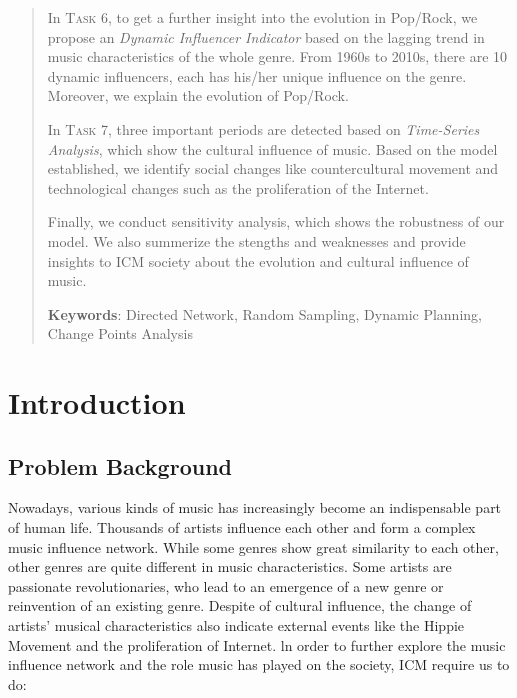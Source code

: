 \documentclass[12pt]{article}  %
\begin{document}
\begin{abstract}
		In \textsc{Task 6}, to get a further insight into the evolution in Pop/Rock, we propose an \textit{Dynamic Influencer Indicator} based on the lagging trend in music characteristics of the whole genre. From 1960s to 2010s, there are 10 dynamic influencers, each has his/her unique influence on the genre. Moreover, we explain the evolution of Pop/Rock.
		
		In \textsc{Task 7}, three important periods are detected based on \textit{Time-Series Analysis}, which show the cultural influence of music. Based on the model established, we identify social changes like countercultural movement and technological changes such as the proliferation of the Internet.
		
		Finally, we conduct sensitivity analysis, which shows the robustness of our model. We also summerize the stengths and weaknesses and provide insights to ICM society about the evolution and cultural influence of music.
		
		
		
		
		
		
		
		
		\vspace{5pt}
		\textbf{Keywords}: Directed Network, Random Sampling, Dynamic Planning, Change Points Analysis
		
	\end{abstract}
	
	\maketitle %
	
	\tableofcontents  %
	
	
	\section{Introduction}
	
	\subsection{Problem Background}
	
	Nowadays, various kinds of music has increasingly become an indispensable part of human life. Thousands of artists influence each other and form a complex music influence network. While some genres show great similarity to each other, other genres are quite different in music characteristics. Some artists are passionate revolutionaries, who lead to an emergence of a new genre or reinvention of an existing genre. Despite of cultural influence, the change of artists' musical characteristics also indicate external events like the Hippie Movement and the proliferation of Internet. ln order to further explore the music influence network and the role music has played on the society, ICM require us to do:
	
\end{document}

